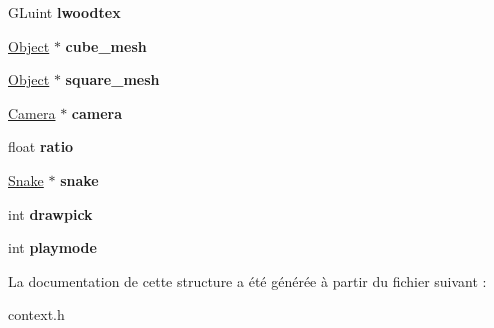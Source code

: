 \begin{DoxyCompactItemize}
\item 
\hypertarget{structcontext_aa45e7b7997c62546548ac4e7bd30596f}{G\-Luint {\bfseries lwoodtex}}\label{structcontext_aa45e7b7997c62546548ac4e7bd30596f}

\item 
\hypertarget{structcontext_aa74c93f4d7a096e690dd12621a484b34}{\hyperlink{structobject}{Object} $\ast$ {\bfseries cube\-\_\-mesh}}\label{structcontext_aa74c93f4d7a096e690dd12621a484b34}

\item 
\hypertarget{structcontext_a3779ff94a6fe22ae4949d8303eea0c26}{\hyperlink{structobject}{Object} $\ast$ {\bfseries square\-\_\-mesh}}\label{structcontext_a3779ff94a6fe22ae4949d8303eea0c26}

\item 
\hypertarget{structcontext_af95833c961e5bd20dcd54e1d46a03c0b}{\hyperlink{structcamera}{Camera} $\ast$ {\bfseries camera}}\label{structcontext_af95833c961e5bd20dcd54e1d46a03c0b}

\item 
\hypertarget{structcontext_a207ad05f99cc72068a92358861ff5e71}{float {\bfseries ratio}}\label{structcontext_a207ad05f99cc72068a92358861ff5e71}

\item 
\hypertarget{structcontext_a408cd599ea288e5b692809edb69e65c2}{\hyperlink{struct_snake}{Snake} $\ast$ {\bfseries snake}}\label{structcontext_a408cd599ea288e5b692809edb69e65c2}

\item 
\hypertarget{structcontext_a3d99a9e2fdae8652db4aa612f8d9cd96}{int {\bfseries drawpick}}\label{structcontext_a3d99a9e2fdae8652db4aa612f8d9cd96}

\item 
\hypertarget{structcontext_aa49a4684df5eedf20a5c1589e381b00e}{int {\bfseries playmode}}\label{structcontext_aa49a4684df5eedf20a5c1589e381b00e}

\end{DoxyCompactItemize}


La documentation de cette structure a été générée à partir du fichier suivant \-:\begin{DoxyCompactItemize}
\item 
context.\-h\end{DoxyCompactItemize}

